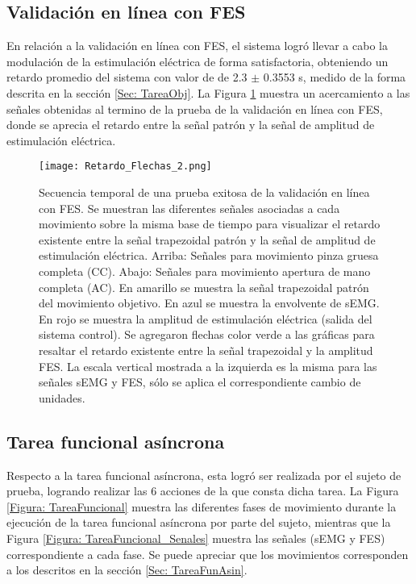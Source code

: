 \subsection{Validación en línea con FES}
En relación a la validación en línea con FES, el sistema logró llevar a cabo la modulación de la estimulación eléctrica de forma satisfactoria, obteniendo un retardo promedio del sistema con valor de de 2.3 $\pm$ 0.3553 s, medido de la forma descrita en la sección \ref{Sec: TareaObj}. La Figura \ref{Figura: Retardo} muestra un acercamiento a las señales obtenidas al termino de la prueba de la validación en línea con FES, donde se aprecia el retardo entre la señal patrón y la señal de amplitud de estimulación eléctrica.

\newpage
\begin{figure}[htbp]
	\centering
	\texttt{[image: Retardo\_Flechas\_2.png]}
	\caption[Secuencia temporal de una prueba exitosa de la validación en línea con FES]{Secuencia temporal de una prueba exitosa de la validación en línea con FES. Se muestran las diferentes señales asociadas a cada movimiento sobre la misma base de tiempo para visualizar el retardo existente entre la señal trapezoidal patrón y la señal de amplitud de estimulación eléctrica. Arriba: Señales para movimiento pinza gruesa completa (CC). Abajo: Señales para movimiento apertura de mano completa (AC). En amarillo se muestra la señal trapezoidal patrón del movimiento objetivo. En azul se muestra la envolvente de sEMG. En rojo se muestra la amplitud de estimulación eléctrica (salida del sistema control). Se agregaron flechas color verde a las gráficas para resaltar el retardo existente entre la señal trapezoidal y la amplitud FES. La escala vertical mostrada a la izquierda es la misma para las señales sEMG y FES, sólo se aplica el correspondiente cambio de unidades.}
	\label{Figura: Retardo}
\end{figure}


\subsection{Tarea funcional asíncrona}
Respecto a la tarea funcional asíncrona, esta logró ser realizada por el sujeto de prueba, logrando realizar las 6 acciones de la que consta dicha tarea. La Figura \ref{Figura: TareaFuncional} muestra las diferentes fases de movimiento durante la ejecución de la tarea funcional asíncrona por parte del sujeto, mientras que la Figura \ref{Figura: TareaFuncional_Senales} muestra las señales (sEMG y FES) correspondiente a cada fase. Se puede apreciar que los movimientos corresponden a los descritos en la sección \ref{Sec: TareaFunAsin}.

